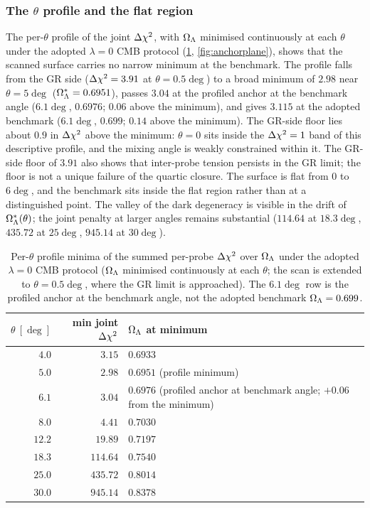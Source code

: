 \subsubsection{The \texorpdfstring{$\theta$}{theta} profile and the flat region}\label{sec:thetaprofile}
The per-$\theta$ profile of the joint $\Delta\chi^2$, with $\Omega_{\Lambda}$ minimised continuously at each $\theta$ under the adopted $\lambda=0$ CMB protocol (\cref{tab:thetaprofile}, \cref{fig:anchorplane}), shows that the scanned surface carries no narrow minimum at the benchmark. The profile falls from the GR side ($\Delta\chi^2=3.91$ at $\theta=0.5\deg$) to a broad minimum of $2.98$ near $\theta=5\deg$ ($\Omega_{\Lambda}^*=0.6951$), passes $3.04$ at the profiled anchor at the benchmark angle ($6.1\deg$, $0.6976$; $0.06$ above the minimum), and gives $3.115$ at the adopted benchmark ($6.1\deg$, $0.699$; $0.14$ above the minimum). The GR-side floor lies about $0.9$ in $\Delta\chi^2$ above the minimum: $\theta=0$ sits inside the $\Delta\chi^2=1$ band of this descriptive profile, and the mixing angle is weakly constrained within it. The GR-side floor of $3.91$ also shows that inter-probe tension persists in the GR limit; the floor is not a unique failure of the quartic closure. The surface is flat from $0$ to $6\deg$, and the benchmark sits inside the flat region rather than at a distinguished point. The valley of the dark degeneracy is visible in the drift of $\Omega_{\Lambda}^*(\theta)$; the joint penalty at larger angles remains substantial ($114.64$ at $18.3\deg$, $435.72$ at $25\deg$, $945.14$ at $30\deg$).

\begin{table}[t]
\centering\small
\caption{Per-$\theta$ profile minima of the summed per-probe $\Delta\chi^2$ over $\Omega_{\Lambda}$ under the adopted $\lambda=0$ CMB protocol ($\Omega_{\Lambda}$ minimised continuously at each $\theta$; the scan is extended to $\theta=0.5\deg$, where the GR limit is approached). The $6.1\deg$ row is the profiled anchor at the benchmark angle, not the adopted benchmark $\Omega_{\Lambda}=0.699$.}\label{tab:thetaprofile}
\begin{tabular}{@{}rrl@{}}
\toprule
$\theta\ [\deg]$ & min joint $\Delta\chi^2$ & $\Omega_{\Lambda}$ at minimum\\
\midrule
$4.0$ & $3.15$ & $0.6933$\\
$5.0$ & $2.98$ & $0.6951$ (profile minimum)\\
$6.1$ & $3.04$ & $0.6976$ (profiled anchor at benchmark angle; $+0.06$ from the minimum)\\
$8.0$ & $4.41$ & $0.7030$\\
$12.2$ & $19.89$ & $0.7197$\\
$18.3$ & $114.64$ & $0.7540$\\
$25.0$ & $435.72$ & $0.8014$\\
$30.0$ & $945.14$ & $0.8378$\\
\bottomrule
\end{tabular}
\end{table}

